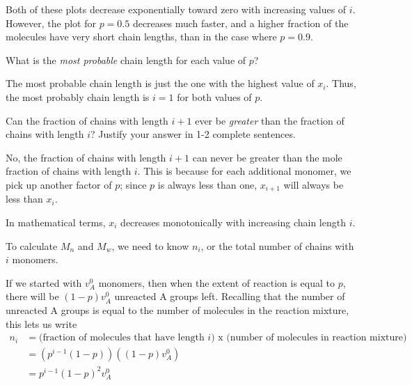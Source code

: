 \begin{activity}
\begin{ctqs}
\begin{solution}[1.5in]
			Both of these plots decrease exponentially toward zero with increasing values of $i$.  However, the plot for $p=0.5$ decreases much faster, and a higher fraction of the molecules have very short chain lengths, than in the case where $p=0.9$.
		\end{solution}
	
	\question What is the \emph{most probable} chain length for each value of $p$?
	
		\begin{solution}[0.5in]
		
			The most probable chain length is just the one with the highest value of $x_i$.  Thus, the most probably chain length is $i=1$ for both values of $p$.
		
		\end{solution}
	
	\question Can the fraction of chains with length $i+1$ ever be \emph{greater} than the fraction of chains with length $i$?  Justify your answer in 1-2 complete sentences.
	
		\begin{solution}[1.5in]
		
			No, the fraction of chains with length $i+1$ can never be greater than the mole fraction of chains with length $i$.  This is because for each additional monomer, we pick up another factor of $p$; since $p$ is always less than one, $x_{i+1}$ will always be less than $x_i$.
			
			In mathematical terms, $x_i$ decreases monotonically with increasing chain length $i$.
		
		\end{solution}
	
\end{ctqs}


\begin{model}

	To calculate $M_n$ and $M_w$, we need to know $n_i$, or the total number of chains with $i$ monomers.
	
	If we started with $v_A^0$ monomers, then when the extent of reaction is equal to $p$, there will be $(1-p)v_A^0$ unreacted A groups left.  Recalling that the number of unreacted A groups is equal to the number of molecules in the reaction mixture, this lets us write
	\begin{align*}
		n_i &= \text{(fraction of molecules that have length }i\text{) x (number of molecules in reaction mixture)}\\
			&= \left(p^{i-1}(1-p)\right)\left((1-p)v_A^0\right)\\
			&= p^{i-1}(1-p)^2v_A^0
	\end{align*}
	

\end{model}
\end{activity}
